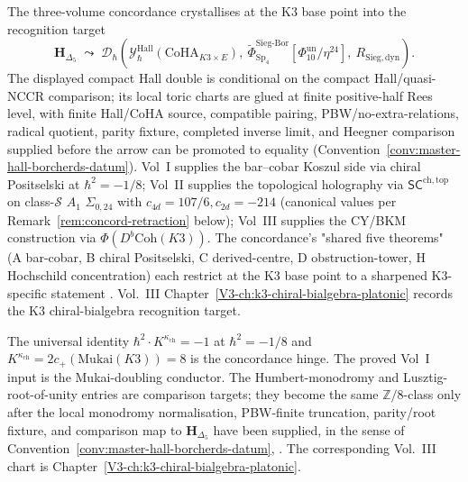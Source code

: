 \begin{remark}
\label{rem:concord-1}
The three-volume concordance crystallises at the K3 base point
into the recognition target
\[
 \mathbf H_{\Delta_5}
 \;\leadsto\;
 \mathcal D_\hbar\!\left(
 \mathcal Y^{\mathrm{Hall}}_\hbar(\mathrm{CoHA}_{K3\times E}),\
 \widetilde\Phi^{\mathrm{Sieg\text{-}Bor}}_{\mathrm{Sp}_4}\!\!\left[\Phi_{10}^{\mathrm{un}}/\eta^{24}\right],\
 R_{\mathrm{Sieg,dyn}}
 \right).
\]
The displayed compact Hall double is conditional on the compact
Hall/quasi-NCCR comparison; its local toric charts are glued at finite
positive-half Rees level, with finite Hall/CoHA source, compatible
pairing, PBW/no-extra-relations, radical quotient, parity fixture,
completed inverse limit, and Heegner comparison supplied before the
arrow can be promoted to equality
\textup{(}Convention~\ref{conv:master-hall-borcherds-datum}\textup{)}.
Vol~I supplies the bar--cobar Koszul side via chiral Positselski at
$\hbar^2 = -1/8$; Vol~II supplies the topological holography via
$\mathsf{SC}^{\mathrm{ch,top}}$ on class-$\mathcal S$ $A_1$
$\Sigma_{0,24}$ with $c_{4d} = 107/6, c_{2d} = -214$
(canonical values per
Remark~\ref{rem:concord-retraction} below); Vol~III supplies the
CY/BKM construction via $\Phi(D^b\mathrm{Coh}(K3))$. The concordance's
"shared five theorems" (A bar-cobar, B chiral Positselski, C derived-centre,
D obstruction-tower, H Hochschild concentration) each restrict at the
K3 base point to a sharpened K3-specific statement
\cite{GritsenkoNikulin1998,SchiffmannVasserot2012,Gaiotto2009}.
Vol.~III Chapter~\ref{V3-ch:k3-chiral-bialgebra-platonic} records the
K3 chiral-bialgebra recognition target.
\end{remark}

\begin{remark}
\label{rem:concord-2}
The universal identity
$\hbar^2 \cdot K^{\kappa_{\mathrm{ch}}} = -1$ at
$\hbar^2 = -1/8$ and
$K^{\kappa_{\mathrm{ch}}}=2c_+(\mathrm{Mukai}(K3))=8$
is the concordance hinge. The proved Vol~I input is the
Mukai-doubling conductor. The Humbert-monodromy and
Lusztig-root-of-unity entries are comparison targets; they become the
same $\mathbb Z/8$-class only after the local monodromy normalisation,
PBW-finite truncation, parity/root fixture, and comparison map to
$\mathbf H_{\Delta_5}$ have been supplied, in the sense of
Convention~\ref{conv:master-hall-borcherds-datum},
\cite{Mukai1987,Bruinier2002,Lusztig1990}. The corresponding
Vol.~III chart is
Chapter~\ref{V3-ch:k3-chiral-bialgebra-platonic}.
\end{remark}

